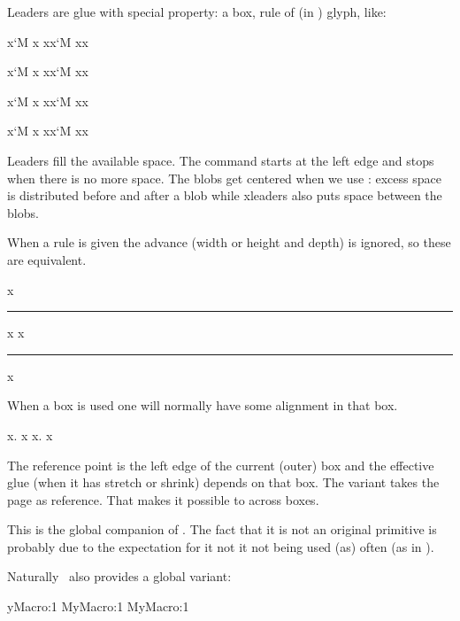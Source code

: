 \stopnewprimitive

\startnewprimitive[title={\prm {gleaders}}]

Leaders are glue with special property: a box, rule of (in \LUAMETATEX) glyph, like:

\startlines
x\leaders   \glyph `M \hfill  x
xx\leaders  \glyph `M \hfill xx

x\cleaders  \glyph `M \hfill x
xx\cleaders \glyph `M \hfill xx

x\xleaders  \glyph `M \hfill x
xx\xleaders \glyph `M \hfill xx

x\gleaders  \glyph `M \hfill x
xx\gleaders \glyph `M \hfill xx
\stoplines

Leaders fill the available space. The  command starts at the left
edge and stops when there is no more space. The blobs get centered when we use
: excess space is distributed before and after a blob while \prm
{xleaders} also puts space between the blobs.

When a rule is given the advance (width or height and depth) is ignored, so these
are equivalent.

\starttyping
x\leaders \hrule           \hfill x
x\leaders \hrule width 1cm \hfill x
\stoptyping

When a box is used one will normally have some alignment in that box.

\starttyping
x\leaders \hbox {\hss.\hss} \hfill            x
x\leaders \hbox {\hss.\hss} \hskip 6cm \relax x
\stoptyping

The reference point is the left edge of the current (outer) box and the effective
glue (when it has stretch or shrink) depends on that box. The 
variant takes the page as reference. That makes it possible to 
across boxes.

\stopnewprimitive

\startnewprimitive[title={\prm {glet}}]

This is the global companion of . The fact that it is not an original
primitive is probably due to the expectation for it not it not being used (as)
often (as in \CONTEXT).

\stopnewprimitive

\startnewprimitive[title={\prm {gletcsname}}]

Naturally \LUAMETATEX\ also provides a global variant:

\starttyping
\expandafter\global\expandafter\let\csname MyMacro:1\endcsname\relax
\expandafter                  \glet\csname MyMacro:1\endcsname\relax
                               \gletcsname MyMacro:1\endcsname\relax
\stoptyping

